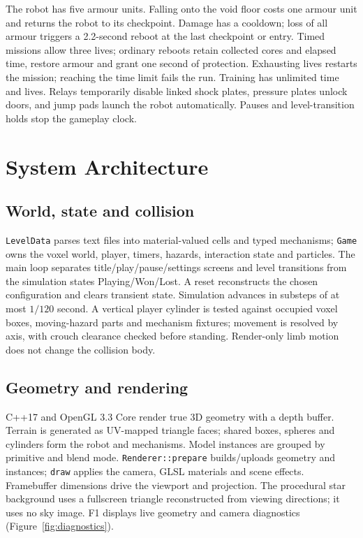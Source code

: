 \documentclass[10pt,a4paper,twocolumn]{article}
\newcommand{\code}[1]{\texttt{#1}}
\begin{document}
The robot has five armour units. Falling onto the void floor costs one armour unit and returns the robot to its checkpoint. Damage has a cooldown; loss of all armour triggers a 2.2-second reboot at the last checkpoint or entry. Timed missions allow three lives; ordinary reboots retain collected cores and elapsed time, restore armour and grant one second of protection. Exhausting lives restarts the mission; reaching the time limit fails the run. Training has unlimited time and lives. Relays temporarily disable linked shock plates, pressure plates unlock doors, and jump pads launch the robot automatically. Pauses and level-transition holds stop the gameplay clock.


\section{System Architecture}\label{sec:system}
\subsection{World, state and collision}
\code{LevelData} parses text files into material-valued cells and typed mechanisms; \code{Game} owns the voxel world, player, timers, hazards, interaction state and particles. The main loop separates title/play/pause/settings screens and level transitions from the simulation states Playing/Won/Lost. A reset reconstructs the chosen configuration and clears transient state. Simulation advances in substeps of at most $1/120$ second. A vertical player cylinder is tested against occupied voxel boxes, moving-hazard parts and mechanism fixtures; movement is resolved by axis, with crouch clearance checked before standing. Render-only limb motion does not change the collision body.

\subsection{Geometry and rendering}
C++17 and OpenGL 3.3 Core render true 3D geometry with a depth buffer. Terrain is generated as UV-mapped triangle faces; shared boxes, spheres and cylinders form the robot and mechanisms. Model instances are grouped by primitive and blend mode. \code{Renderer::}\allowbreak\code{prepare} builds/uploads geometry and instances; \code{draw} applies the camera, GLSL materials and scene effects. Framebuffer dimensions drive the viewport and projection. The procedural star background uses a fullscreen triangle reconstructed from viewing directions; it uses no sky image. F1 displays live geometry and camera diagnostics (Figure~\ref{fig:diagnostics}).
\end{document}
